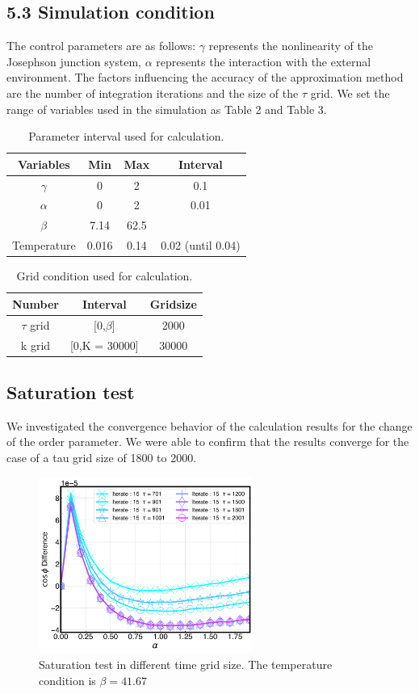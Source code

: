 \documentclass{article}[12pt]
\begin{document}
\begin{spacing}{1.5}
\subsection*{5.3 Simulation condition}
The control parameters are as follows: $\gamma$ represents the nonlinearity of the Josephson junction system, 
$\alpha$ represents the interaction with the external environment. 
The factors influencing the accuracy of the approximation method are the number of integration iterations and the size of the $\tau$ grid. 
We set the range of variables used in the simulation as Table 2 and Table 3.
\begin{table}[htbp]
  \centering
  \renewcommand{\arraystretch}{1.2}  %
  \begin{tabular}{@{}cccc@{}}
  \toprule
  \textbf{Variables} & \textbf{Min} & \textbf{Max}  & \textbf{Interval}\\ 
  \midrule
  $\gamma$ & 0 & 2 & 0.1 \\
  $\alpha$ & 0 & 2 & 0.01 \\
  $\beta$ & 7.14 & 62.5 &  \\
  Temperature & 0.016 & 0.14 & 0.02 (until 0.04) \\
  \bottomrule
  \end{tabular}
  \caption{Parameter interval used for calculation.}
  \end{table}
\begin{table}[htbp]
  \centering
  \renewcommand{\arraystretch}{1.2}  %
  \begin{tabular}{@{}ccc@{}}
  \toprule
  \textbf{Number} & \textbf{Interval} & \textbf{Gridsize}\\ 
  \midrule
  $\tau$ grid & [0,$\beta$] & 2000 \\
  k grid & [0,K = 30000] & 30000 \\
  \bottomrule
  \end{tabular}
  \caption{Grid condition used for calculation.}
  \end{table}
\subsection*{Saturation test}
We investigated the convergence behavior of the calculation results for the change of the order parameter. 
We were able to confirm that the results converge for the case of a tau grid size of 1800 to 2000. 
\begin{figure}[htbp]
  \centerline{\includegraphics[width=7cm]{TexFigure/Diff_Ns3_g_b_35.71_41.67_n_15_tauchange (1)-1.png}}
  \caption{Saturation test in different time grid size. The temperature condition is $\beta = 41.67$}
\end{figure}

\end{spacing}
\end{document}
